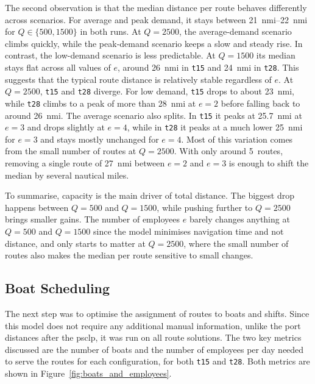 \documentclass[12pt]{article}
\begin{document}
The second observation is that the median distance per route behaves differently across scenarios. For average and peak demand, it stays between \qtyrange{21}{22}{nmi} for \(Q \in \{500, 1500\}\) in both runs. At \(Q=2500\), the average-demand scenario climbs quickly, while the peak-demand scenario keeps a slow and steady rise. In contrast, the low-demand scenario is less predictable. At \(Q=1500\) its median stays flat across all values of \(e\), around \qty{26}{nmi} in \texttt{t15} and \qty{24}{nmi} in \texttt{t28}. This suggests that the typical route distance is relatively stable regardless of \(e\). At \(Q=2500\), \texttt{t15} and \texttt{t28} diverge. For low demand, \texttt{t15} drops to about \qty{23}{nmi}, while \texttt{t28} climbs to a peak of more than \qty{28}{nmi} at \(e=2\) before falling back to around \qty{26}{nmi}. The average scenario also splits. In \texttt{t15} it peaks at \qty{25.7}{nmi} at \(e=3\) and drops slightly at \(e=4\), while in \texttt{t28} it peaks at a much lower \qty{25}{nmi} for \(e=3\) and stays mostly unchanged for \(e=4\). Most of this variation comes from the small number of routes at \(Q=2500\). With only around \qty{5}{routes}, removing a single route of \qty{27}{nmi} between \(e=2\) and \(e=3\) is enough to shift the median by several nautical miles.

To summarise, capacity is the main driver of total distance. The biggest drop happens between \(Q=500\) and \(Q=1500\), while pushing further to \(Q=2500\) brings smaller gains. The number of employees \(e\) barely changes anything at \(Q=500\) and \(Q=1500\) since the model minimises navigation time and not distance, and only starts to matter at \(Q=2500\), where the small number of routes also makes the median per route sensitive to small changes.

\subsection{Boat Scheduling}
\label{subsec:boat-scheduling}

The next step was to optimise the assignment of routes to boats and shifts. Since this model does not require any additional manual information, unlike the port distances after the \ac{psclp}, it was run on all route solutions. The two key metrics discussed are the number of boats and the number of employees per day needed to serve the routes for each configuration, for both \texttt{t15} and \texttt{t28}. Both metrics are shown in Figure~\ref{fig:boats_and_employees}.
\end{document}

